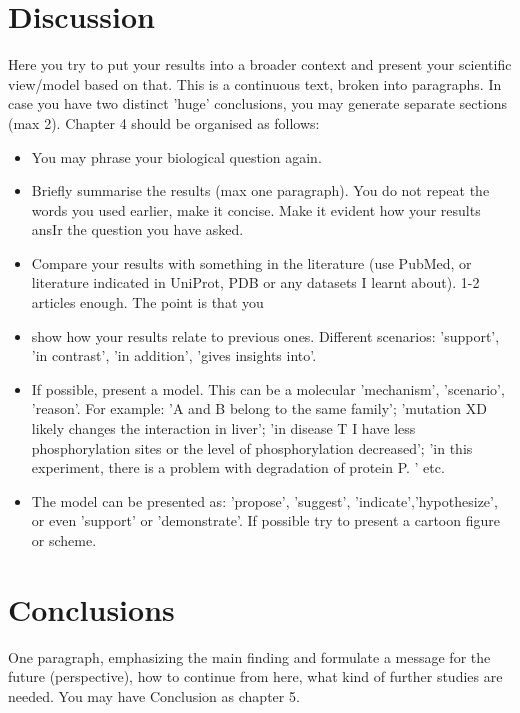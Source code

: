 \documentclass[prl,twocolumn]{revtex4-1}
\begin{document}
\section{Discussion}
{\color{blue}
Here you try to put your results into a broader context and present your scientific view/model based on that. This is a continuous text, broken into paragraphs. 
In case you have two distinct 'huge' conclusions, you may generate separate sections (max 2). Chapter 4 should be organised as follows:
\begin{itemize}
\item You may phrase your biological question again.
\item Briefly summarise the results (max one paragraph). You do not repeat the words you used earlier, make it concise. Make it evident how your results ansIr the question you have asked.
\item Compare your results with something in the literature (use PubMed, or literature indicated in UniProt, PDB or any datasets I learnt about). 1-2 articles enough. The point is that you
\item show how your results relate to previous ones. Different scenarios: 'support', 'in contrast', 'in addition', 'gives insights into'.
\item If possible, present a model. This can be a molecular 'mechanism', 'scenario', 'reason'. For example: 'A and B belong to the same family'; 'mutation XD likely changes the interaction in liver'; 'in disease T I have less phosphorylation sites or the level of phosphorylation decreased'; 'in this experiment, there is a problem with degradation of protein P. ' etc.
\item The model can be presented as: 'propose', 'suggest', 'indicate','hypothesize', or even 'support' or 'demonstrate'. If possible try to present a cartoon figure or scheme.
\end{itemize}
}
%
%
%
\section{Conclusions}
{ \color{blue}
One paragraph, emphasizing the main finding and formulate a message for the future (perspective), how to continue from here, what kind of further studies are needed. You may have Conclusion as chapter 5.
}
%
%
%
\end{document}
